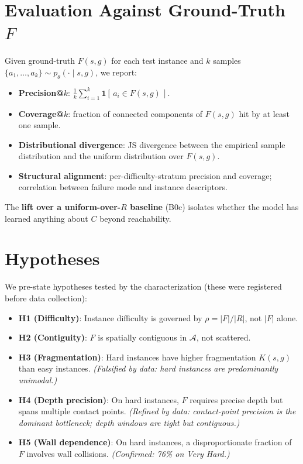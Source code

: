 \documentclass[11pt]{article}
\begin{document}
\section{Evaluation Against Ground-Truth $F$}

Given ground-truth $F(s, g)$ for each test instance and $k$ samples
$\{a_1, \dots, a_k\} \sim p_\theta(\cdot \mid s, g)$, we report:
\begin{itemize}[leftmargin=2em,itemsep=0pt]
  \item \textbf{Precision@$k$}:
        $\frac{1}{k} \sum_{i=1}^{k} \mathbf{1}[\,a_i \in F(s, g)\,]$.
  \item \textbf{Coverage@$k$}: fraction of connected components of $F(s, g)$
        hit by at least one sample.
  \item \textbf{Distributional divergence}: JS divergence between the
        empirical sample distribution and the uniform distribution over
        $F(s, g)$.
  \item \textbf{Structural alignment}: per-difficulty-stratum precision and
        coverage; correlation between failure mode and instance descriptors.
\end{itemize}

The \textbf{lift over a uniform-over-$R$ baseline} (B0c) isolates whether
the model has learned anything about $C$ beyond reachability.

\section{Hypotheses}

We pre-state hypotheses tested by the characterization (these were registered
before data collection):
\begin{itemize}[leftmargin=2em,itemsep=2pt]
  \item \textbf{H1 (Difficulty)}: Instance difficulty is governed by
        $\rho = |F|/|R|$, not $|F|$ alone.
  \item \textbf{H2 (Contiguity)}: $F$ is spatially contiguous in
        $\mathcal{A}$, not scattered.
  \item \textbf{H3 (Fragmentation)}: Hard instances have higher fragmentation
        $K(s, g)$ than easy instances. \emph{(Falsified by data: hard
        instances are predominantly unimodal.)}
  \item \textbf{H4 (Depth precision)}: On hard instances, $F$ requires
        precise depth but spans multiple contact points. \emph{(Refined by
        data: contact-point precision is the dominant bottleneck; depth
        windows are tight but contiguous.)}
  \item \textbf{H5 (Wall dependence)}: On hard instances, a disproportionate
        fraction of $F$ involves wall collisions. \emph{(Confirmed: 76\% on
        Very Hard.)}
\end{itemize}
\end{document}
